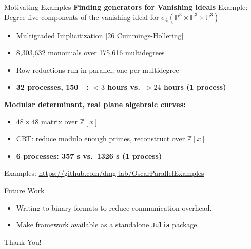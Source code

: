 \documentclass[9pt]{beamer}
\newcommand\Julia{\texttt{Julia}\xspace}
\newcommand\ZZ{{\mathbb Z}}
\newcommand\PP{{\mathbb P}}
\begin{document}
\begin{frame}{Motivating Examples}
  \textbf{Finding generators for Vanishing ideals}
  Example: Degree five components of the vanishing ideal for $\sigma_4(\PP^3 \times \PP^3 \times \PP^3)$
  \begin{itemize}
    \item Multigraded Implicitization [26 Cummings-Hollering]
    \item 8{,}303{,}632 monomials over 175{,}616 multidegrees
    \item Row reductions run in parallel, one per multidegree
    \item \textbf{32 processes, \SI{150}{\giga\byte}: $<3$ hours vs.\ $>24$ hours (1 process)}
  \end{itemize}
  \pause
  \bigskip
  \textbf{Modular determinant, real plane algebraic curves:}
  \begin{itemize}
    \item $48 \times 48$ matrix over $\ZZ[x]$
    \item CRT: reduce modulo enough primes, reconstruct over $\ZZ[x]$
    \item \textbf{6 processes: 357 s vs.\ 1326 s (1 process)}
  \end{itemize}
  \bigskip
  \footnotesize Examples: \url{https://github.com/dmg-lab/OscarParallelExamples}
\end{frame}

\begin{frame}{Future Work}
  \begin{itemize}\bigskipamount
  \item Writing to binary formats to reduce communication overhead.
  \item Make framework available as a standalone \Julia package.
  \end{itemize}
  \vfill
  \pause
  \begin{center}
    \Large Thank You!
  \end{center}
  \vfill
\end{frame}
\end{document}
